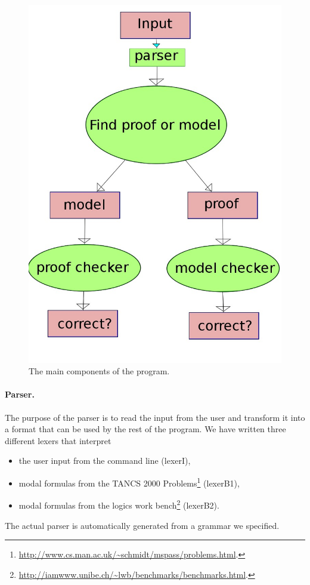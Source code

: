 \begin{figure}
  \caption{The main components of the program.}
  \begin{center}
    \includegraphics[scale=0.4]{design.jpeg}
  \end{center}
  \label{components}
\end{figure}

\paragraph{Parser.}

The purpose of the parser is to read the input from the user
and transform it into a format that can be used by the rest of the program. We have
written three different lexers that interpret
\begin{itemize}
\item the user input from the command line (lexerI),
\item modal formulas from the TANCS 2000 Problems\footnote{\url{http://www.cs.man.ac.uk/~schmidt/mspass/problems.html}.} (lexerB1),
\item modal formulas from the logics work bench\footnote{\url{http://iamwww.unibe.ch/~lwb/benchmarks/benchmarks.html}.} (lexerB2).
\end{itemize} 
The actual parser is automatically generated from a grammar we specified.

